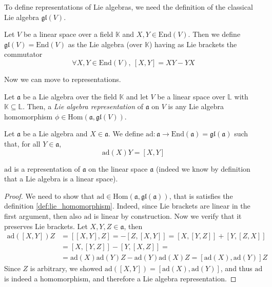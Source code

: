 To define representations of Lie algebras, we need the definition of the classical Lie algebra $\mathfrak{gl}(V)$.

\begin{definition}
    Let $V$ be a linear space over a field $\mathbb{K}$ and $X, Y \in \text{End}(V)$. Then we define $\mathfrak{gl}(V) = \text{End}(V)$ as the Lie algebra (over $\mathbb{K}$) having as Lie brackets the commutator
    \begin{equation*}
        \forall X, Y \in \text{End}(V),\ [X, Y] = XY - YX
    \end{equation*} 
\end{definition}

Now we can move to representations.

\begin{definition}
    Let $\mathfrak{a}$ be a Lie algebra over the field $\mathbb{K}$ and let $V$ be a linear space over $\mathbb{L}$ with $\mathbb{K} \subseteq \mathbb{L}$.
    Then, a \emph{Lie algebra representation} of $\mathfrak{a}$ on $V$ is any Lie algebra homomorphism $\phi \in \text{Hom}(\mathfrak{a}, \mathfrak{gl}(V))$.
\end{definition}

\begin{definition}
    Let $\mathfrak{a}$ be a Lie algebra and $X \in \mathfrak{a}$.
    We define $\text{ad}: \mathfrak{a} \rightarrow \text{End}(\mathfrak{a}) = \mathfrak{gl}(\mathfrak{a})$ such that, for all $Y \in \mathfrak{a}$,
    \begin{equation*}
        \text{ad}(X)Y = [X,Y]
    \end{equation*}
\end{definition}

\begin{proposition}
    $\text{ad}$ is a representation of $\mathfrak{a}$ on the linear space $\mathfrak{a}$ (indeed we know by definition that a Lie algebra is a linear space).
\end{proposition}
\begin{proof}
    We need to show that $\text{ad} \in \text{Hom}(\mathfrak{a}, \mathfrak{gl}(\mathfrak{a}))$, that is satisfies the definition \ref{def:lie_homomorphism}.
    Indeed, since Lie brackets are linear in the first argument, then also $\text{ad}$ is linear by construction.
    Now we verify that it preserves Lie brackets. Let $X, Y, Z \in \mathfrak{a}$, then
    \begin{align*}
        \text{ad}([X,Y])Z &= [[X,Y], Z] = -[Z, [X,Y]] = [X, [Y,Z]] + [Y, [Z,X]] \\
        &= [X, [Y,Z]] - [Y, [X,Z]] = \\
        &= \text{ad}(X)\text{ad}(Y)Z - \text{ad}(Y)\text{ad}(X)Z = [\text{ad}(X), \text{ad}(Y)]Z
    \end{align*}
    Since $Z$ is arbitrary, we showed $\text{ad}([X,Y]) = [\text{ad}(X), \text{ad}(Y)]$, and thus $\text{ad}$ is indeed a homomorphism, and therefore a Lie algebra representation.
\end{proof}